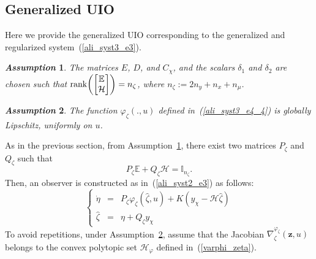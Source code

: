 \documentclass{ifacconf}
\def\eqref#1{(\ref{#1})}
\def\rank{\mathop{{\rm rank}}}
\newtheorem{assumption}{\it \textbf{Assumption}}%
\begin{document}
{%




\subsection{Generalized UIO}\label{generalized_uio}
Here we provide the generalized UIO corresponding to the generalized and regularized system~\eqref{ali_syst3_e3}.

\begin{assumption}\label{ali_gen_hyp1}
The matrices $E$, $D$, and $C_{\chi}$, and the scalars $\delta_1$ and $\delta_2$ are chosen such that $\rank\!\left( \begin{bmatrix} \mathbb{E} \\ \mathcal{H} \end{bmatrix} \right)=n_{\zeta}$, where $n_{\zeta}:=2n_y+n_x+n_\mu$.
\end{assumption}

\begin{assumption}\label{ali_gen_hyp2}
The function $\varphi_{\zeta}(.,u)$ defined in~\eqref{ali_syst3_e4_4} is globally Lipschitz, uniformly on $u$.
\end{assumption}


As in the previous section, from Assumption~\ref{ali_gen_hyp1},  there exist two matrices $P_{\zeta}$ and $Q_{\zeta}$ such that
\begin{equation}\label{ali_syst3_e5'}
 P_{\zeta} \mathbb{E} + Q_{\zeta} \mathcal{H} = \mathbb{I}_{n_{\zeta}}.
\end{equation}
Then, an observer is constructed as in~\eqref{ali_syst2_e3} as follows: 
\begin{equation}\label{ali_syst3_e5}
\left\{
\begin{array}{rcl}
\dot{\eta} & = & P_{\zeta} \varphi_{\zeta}(\hat{\zeta},u) + K \left( y_{\chi} - \mathcal{H} \hat{\zeta} \right)
\\
\hat{\zeta} & = & \eta + Q_{\zeta} y_{\chi} 
\end{array}
\right.
\end{equation}
To avoid repetitions, under Assumption~\ref{ali_gen_hyp2}, assume that the Jacobian $\nabla^{\varphi_{\zeta}}_{\zeta}(\bm{z},u)$ belongs to the convex polytopic set $\mathcal{H}_{\varphi} $ defined in~\eqref{varphi_zeta}.

}
\end{document}
